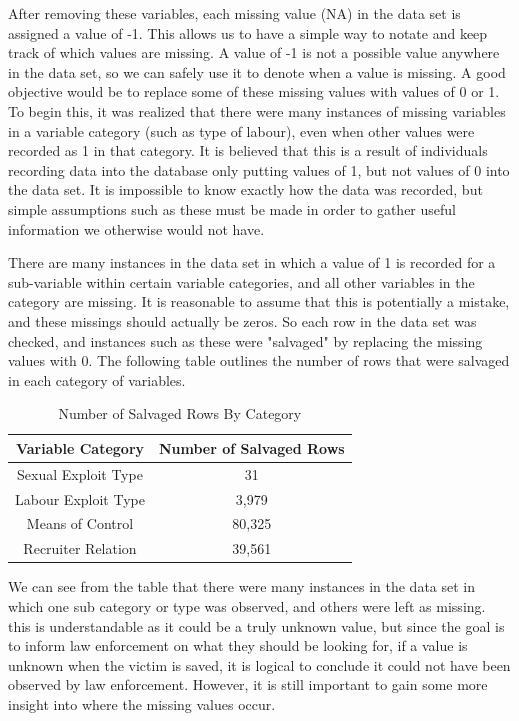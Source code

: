 \documentclass{article} %
\begin{document}
After removing these variables, each missing value (NA) in the data set is assigned a value of -1. This allows us to have a simple way to notate and keep track of which values are missing. A value of -1 is not a possible value anywhere in the data set, so we can safely use it to denote when a value is missing. A good objective would be to replace some of these missing values with values of 0 or 1. To begin this, it was realized that there were many instances of missing variables in a variable category (such as type of labour), even when other values were recorded as 1 in that category. It is believed that this is a result of individuals recording data into the database only putting values of 1, but not values of 0 into the data set. It is impossible to know exactly how the data was recorded, but simple assumptions such as these must be made in order to gather useful information we otherwise would not have.

There are many instances in the data set in which a value of 1 is recorded for a sub-variable within certain variable categories, and all other variables in the category are missing. It is reasonable to assume that this is potentially a mistake, and these missings should actually be zeros. So each row in the data set was checked, and instances such as these were "salvaged" by replacing the missing values with 0. The following table outlines the number of rows that were salvaged in each category of variables.

\FloatBarrier
\begin{table}[!ht]
	\centering
	\caption{Number of Salvaged Rows By Category}
	\begin{tabular}{cc}
		\toprule
		 Variable Category  & Number of Salvaged Rows \\ \midrule
		Sexual Exploit Type &           31            \\
		Labour Exploit Type &          3,979          \\
		 Means of Control   &         80,325          \\
		Recruiter Relation  &         39,561          \\ \bottomrule
	\end{tabular}
\end{table}
\FloatBarrier
We can see from the table that there were many instances in the data set in which one sub category or type was observed, and others were left as missing. this is understandable as it could be a truly unknown value, but since the goal is to inform law enforcement on what they should be looking for, if a value is unknown when the victim is saved, it is logical to conclude it could not have been observed by law enforcement. However, it is still important to gain some more insight into where the missing values occur.
\end{document}
